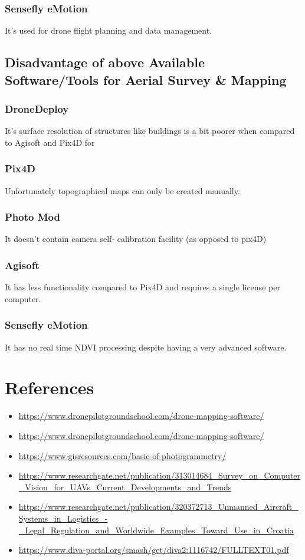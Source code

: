 \documentclass[11pt,twocolumn,letterpaper]{article}
\begin{document}
\subsubsection{Sensefly eMotion}
It's used for drone flight planning and data management.


\subsection{Disadvantage of above Available Software/Tools for Aerial Survey & Mapping }

\subsubsection{DroneDeploy}
It's surface resolution of structures like buildings is a bit poorer when compared to Agisoft and Pix4D for


\subsubsection{Pix4D}
Unfortunately topographical maps can only be created manually.


\subsubsection{Photo Mod}
It doesn't contain camera self- calibration facility (as opposed to pix4D)

\subsubsection{Agisoft}
It has less functionality compared to Pix4D and requires a single license per computer.


\subsubsection{Sensefly eMotion}
It has no real time NDVI processing despite having a very advanced software.

\section{References}
\begin{itemize}
    \item \url{https://www.dronepilotgroundschool.com/drone-mapping-software/}
    \item \url{https://www.dronepilotgroundschool.com/drone-mapping-software/}
    \item \url{https://www.gisresources.com/basic-of-photogrammetry/}
    \item \url{https://www.researchgate.net/publication/313014684_Survey_on_Computer_Vision_for_UAVs_Current_Developments_and_Trends}
    \item \url{https://www.researchgate.net/publication/320372713_Unmanned_Aircraft_Systems_in_Logistics_-_Legal_Regulation_and_Worldwide_Examples_Toward_Use_in_Croatia}
    \item \url{https://www.diva-portal.org/smash/get/diva2:1116742/FULLTEXT01.pdf}

\end{itemize}
\end{document}
